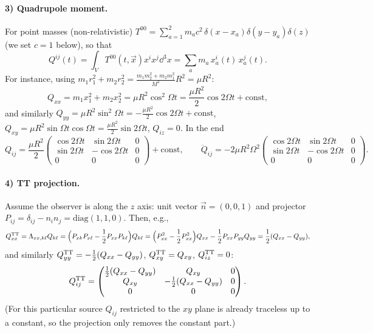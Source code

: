 \paragraph{3) Quadrupole moment.} For point masses (non-relativistic) $T^{00}=\sum_{a=1}^2m_ac^2\,\delta(x-x_a)\delta(y-y_a)\delta(z)$ (we set $c=1$ below), so that
\[
  Q^{ij}(t)=\int_VT^{00}(t,\vec x)x^ix^j\dd^3x=\sum_am_a\,x_a^i(t)\,x_a^j(t).
\]
For instance, using $m_1r_1^2+m_2r_2^2=\frac{m_1m_2^2+m_2m_1^2}{M^2}R^2=\mu R^2$:
\[
  Q_{xx}=m_1x_1^2+m_2x_2^2=\mu R^2\cos^2\Omega t=\frac{\mu R^2}{2}\cos2\Omega t+\text{const},
\]
and similarly $Q_{yy}=\mu R^2\sin^2\Omega t=-\frac{\mu R^2}2\cos2\Omega t+\text{const}$, $Q_{xy}=\mu R^2\sin\Omega t\cos\Omega t=\frac{\mu R^2}{2}\sin2\Omega t$, $Q_{iz}=0$. In the end
\begin{equation}
  Q_{ij}=\frac{\mu R^2}{2}\begin{pmatrix}\cos2\Omega t&\sin2\Omega t&0\\ \sin2\Omega t&-\cos2\Omega t&0\\0&0&0\end{pmatrix}+\text{const},
  \qquad\ddot Q_{ij}=-2\mu R^2\Omega^2\begin{pmatrix}\cos2\Omega t&\sin2\Omega t&0\\ \sin2\Omega t&-\cos2\Omega t&0\\0&0&0\end{pmatrix}.
\end{equation}
\paragraph{4) TT projection.} Assume the observer is along the $z$ axis: unit vector $\vec n=(0,0,1)$ and projector $P_{ij}=\delta_{ij}-n_in_j=\mathrm{diag}(1,1,0)$. Then, e.g.,
\[
  Q^{\rm TT}_{xx}=\Lambda_{xx,k\ell}Q_{k\ell}=\Big(P_{xk}P_{x\ell}-\frac12P_{xx}P_{k\ell}\Big)Q_{k\ell}=\Big(P_{xx}^2-\frac12P_{xx}^2\Big)Q_{xx}-\frac12P_{xx}P_{yy}Q_{yy}=\frac12(Q_{xx}-Q_{yy}),
\]
and similarly $Q^{\rm TT}_{yy}=-\frac12(Q_{xx}-Q_{yy})$, $Q^{\rm TT}_{xy}=Q_{xy}$, $Q^{\rm TT}_{iz}=0$:
\[
  Q^{\rm TT}_{ij}=\begin{pmatrix}\frac12(Q_{xx}-Q_{yy})&Q_{xy}&0\\ Q_{xy}&-\frac12(Q_{xx}-Q_{yy})&0\\0&0&0\end{pmatrix}.
\]
(For this particular source $Q_{ij}$ restricted to the $xy$ plane is already traceless up to a constant, so the projection only removes the constant part.)

